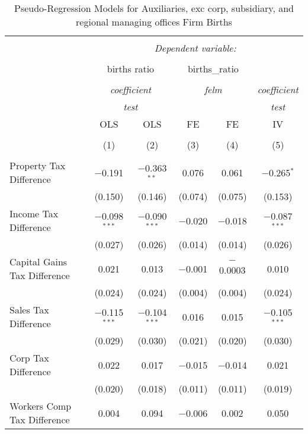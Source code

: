 
\begin{table}[!htbp] \centering 
  \caption{Pseudo-Regression Models for  Auxiliaries, exc corp, subsidiary, and regional managing offices Firm Births} 
  \label{} 
\begin{tabular}{@{\extracolsep{5pt}}lccccc} 
\\[-1.8ex]\hline 
\hline \\[-1.8ex] 
 & \multicolumn{5}{c}{\textit{Dependent variable:}} \\ 
\cline{2-6} 
\\[-1.8ex] & \multicolumn{2}{c}{births ratio} & \multicolumn{2}{c}{births\_ratio} &   \\ 
\\[-1.8ex] & \multicolumn{2}{c}{\textit{coefficient}} & \multicolumn{2}{c}{\textit{felm}} & \textit{coefficient} \\ 
 & \multicolumn{2}{c}{\textit{test}} & \multicolumn{2}{c}{\textit{}} & \textit{test} \\ 
 & OLS & OLS & FE & FE & IV \\ 
\\[-1.8ex] & (1) & (2) & (3) & (4) & (5)\\ 
\hline \\[-1.8ex] 
 Property Tax Difference & $-$0.191 & $-$0.363$^{**}$ & 0.076 & 0.061 & $-$0.265$^{*}$ \\ 
  & (0.150) & (0.146) & (0.074) & (0.075) & (0.153) \\ 
  Income Tax Difference & $-$0.098$^{***}$ & $-$0.090$^{***}$ & $-$0.020 & $-$0.018 & $-$0.087$^{***}$ \\ 
  & (0.027) & (0.026) & (0.014) & (0.014) & (0.026) \\ 
  Capital Gains Tax Difference & 0.021 & 0.013 & $-$0.001 & $-$0.0003 & 0.010 \\ 
  & (0.024) & (0.024) & (0.004) & (0.004) & (0.024) \\ 
  Sales Tax Difference & $-$0.115$^{***}$ & $-$0.104$^{***}$ & 0.016 & 0.015 & $-$0.105$^{***}$ \\ 
  & (0.029) & (0.030) & (0.021) & (0.020) & (0.030) \\ 
  Corp Tax Difference & 0.022 & 0.017 & $-$0.015 & $-$0.014 & 0.021 \\ 
  & (0.020) & (0.018) & (0.011) & (0.011) & (0.019) \\ 
  Workers Comp Tax Difference & 0.004 & 0.094 & $-$0.006 & 0.002 & 0.050 \\ 

\end{tabular}
\end{table}
